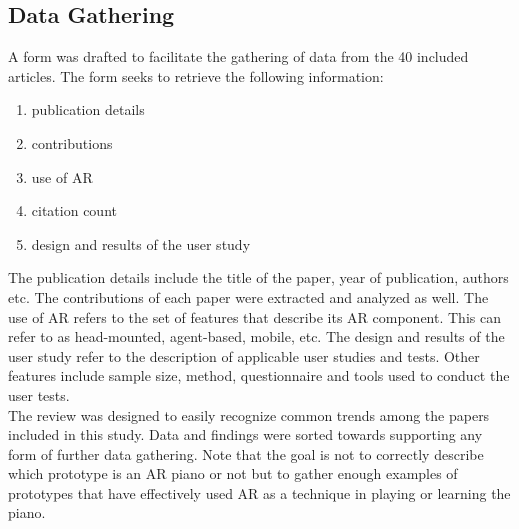 \documentclass[manuscript,screen]{acmart}
\begin{document}
\subsection{Data Gathering}
A form was drafted to facilitate the gathering of data from the 40 included articles. The form seeks to retrieve the following information: 
\begin{enumerate}
    \item publication details
    \item contributions
    \item use of AR
    \item citation count
    \item design and results of the user study
\end{enumerate}
The publication details include the title of the paper, year of publication, authors etc. The contributions of each paper were extracted and analyzed as well. The use of AR refers to the set of features that describe its AR component. This can refer to as head-mounted, agent-based, mobile, etc. The design and results of the user study refer to the description of applicable user studies and tests. Other features include sample size, method, questionnaire and tools used to conduct the user tests. \\

The review was designed to easily recognize common trends among the papers included in this study. Data and findings were sorted towards supporting any form of further data gathering. Note that the goal is not to correctly describe which prototype is an AR piano or not but to gather enough examples of prototypes that have effectively used AR as a technique in playing or learning the piano.  
\end{document}
